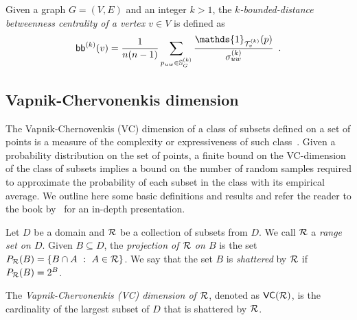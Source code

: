 \begin{definition}\label{def:kboundbetweenness}
  \citep{BorgattiE06,Brandes08} Given a graph $G=(V,E)$ and an integer $k>1$,
  the \emph{$k$-bounded-distance betweenness centrality of a vertex $v\in V$} is
  defined as
  \[
  \kboundbetw^{(k)}(v)=\frac{1}{n(n-1)}\sum_{p_{uw}\in\mathbb{S}^{(k)}_G}\frac{\mathds{1}_{\mathcal{T}^{(k)}_v}(p)}{\sigma^{(k)}_{uw}}
  \enspace.
  \]
\end{definition}
\fi

\subsection{Vapnik-Chervonenkis dimension}\label{sec:prelvcdim}
The Vapnik-Chernovenkis (VC) dimension of a class of subsets defined
on a set of points is a measure of the complexity or expressiveness of such
class~\citep{VapnikC71}. Given a probability distribution on the set of points,
a finite bound on the VC-dimension of the class of subsets implies a bound on
the number of random samples required to approximate the probability of each
subset in the class with its empirical average. We outline here some basic
definitions and results and refer the reader to the book by~\citet{MohriRT12}
for an in-depth presentation.

Let $D$ be a domain and $\mathcal{R}$ be a collection of subsets from $D$. We call
$\mathcal{R}$ a \emph{range set on $D$}.
Given $B\subseteq D$, the \emph{projection of $\mathcal{R}$ on $B$} is the set 
$P_{\mathcal{R}}(B)=\{ B\cap A ~:~ A\in\mathcal{R}\}$. We say that the set $B$ is
\emph{shattered} by $\mathcal{R}$ if $P_{\mathcal{R}}(B)=2^B$.

\begin{definition}\label{def:vcdim}
  The \emph{Vapnik-Chervonenkis (VC) dimension of $\mathcal{R}$}, denoted as
  $\mathsf{VC}(\mathcal{R})$, is the cardinality of the largest subset of $D$ that is
  shattered by $\mathcal{R}$.
\end{definition}

